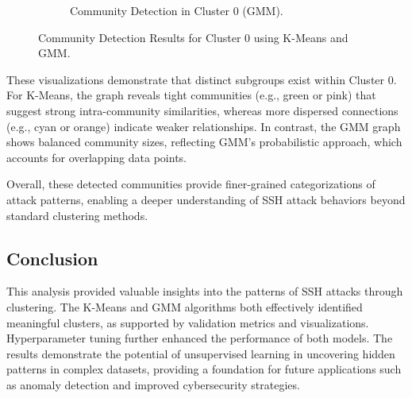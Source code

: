 \begin{figure}[H]
\begin{subfigure}[c]{0.47\textwidth}
                        \caption{Community Detection in Cluster 0 (GMM).}
                        \label{fig:gmm_graph}
                    \end{subfigure}
                    \vspace{-0.1cm}
                    \caption{Community Detection Results for Cluster 0 using K-Means and GMM.}
                \end{figure}
            
                These visualizations demonstrate that distinct subgroups exist within Cluster 0. For K-Means, the graph reveals tight communities (e.g., green or pink) that suggest strong intra-community similarities, whereas more dispersed connections (e.g., cyan or orange) indicate weaker relationships. In contrast, the GMM graph shows balanced community sizes, reflecting GMM's probabilistic approach, which accounts for overlapping data points. 

                Overall, these detected communities provide finer-grained categorizations of attack patterns, enabling a deeper understanding of SSH attack behaviors beyond standard clustering methods.

    \subsection{Conclusion}
    
        This analysis provided valuable insights into the patterns of SSH attacks through clustering. The K-Means and GMM algorithms both effectively identified meaningful clusters, as supported by validation metrics and visualizations. Hyperparameter tuning further enhanced the performance of both models. The results demonstrate the potential of unsupervised learning in uncovering hidden patterns in complex datasets, providing a foundation for future applications such as anomaly detection and improved cybersecurity strategies.
